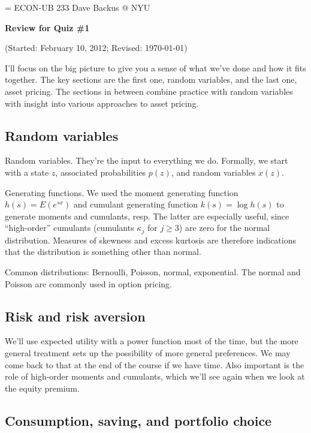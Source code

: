 \documentclass[11pt]{article}
\begin{document}
\parskip=\bigskipamount
\parindent=0.0in
\thispagestyle{empty}
{\large ECON-UB 233 \hfill Dave Backus @ NYU}

\bigskip\bigskip
\centerline{\Large \bf Review for Quiz \#1}
\centerline{(Started: February 10, 2012; Revised: \today)}

\bigskip
I'll focus on the big picture to give you a sense of
what we've done and how it fits together.
The key sections are the first one, random variables,
and the last one, asset pricing.
The sections in between combine practice with random variables
with insight into various approaches to asset pricing.


\subsection*{Random variables}

Random variables.  They're the input to everything we do.
Formally, we start with a state $z$, associated probabilities $p(z)$,
and random variables $x(z)$.

Generating functions.
We used the moment generating function $h(s) = E (e^{sx})$
and cumulant generating function $k(s) = \log h(s)$ to
generate moments and cumulants, resp.
The latter are especially useful, since ``high-order'' cumulants
(cumulants $\kappa_j$ for $j \geq 3$)
are zero for the normal distribution.
Measures of skewness and excess kurtosis are therefore
indications that the distribution is something other than normal.

Common distributions:  Bernoulli, Poisson, normal, exponential.
The normal and Poisson are commonly used in option pricing.


\subsection*{Risk and risk aversion}

We'll use expected utility with a power function most of the time,
but the more general treatment sets up
the possibility of more general preferences.
We may come back to that at the end of the course
if we have time.
Also important is the role of high-order moments and cumulants,
which we'll see again when we look at the equity premium.


\subsection*{Consumption, saving, and portfolio choice}
\end{document}
